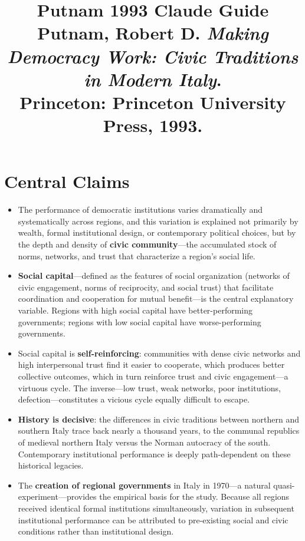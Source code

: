 \documentclass[12pt]{article}
\title{\textbf{Putnam 1993 Claude Guide}\\
\large Putnam, Robert D. \textit{Making Democracy Work: Civic Traditions in Modern Italy}.\\
Princeton: Princeton University Press, 1993.}
\author{}
\date{}
\begin{document}
\maketitle
\tableofcontents
\newpage

\section{Central Claims}

\begin{itemize}[leftmargin=*, itemsep=4pt]
    \item The performance of democratic institutions varies dramatically and systematically across regions, and this variation is explained not primarily by wealth, formal institutional design, or contemporary political choices, but by the depth and density of \textbf{civic community}---the accumulated stock of norms, networks, and trust that characterize a region's social life.
    \item \textbf{Social capital}---defined as the features of social organization (networks of civic engagement, norms of reciprocity, and social trust) that facilitate coordination and cooperation for mutual benefit---is the central explanatory variable. Regions with high social capital have better-performing governments; regions with low social capital have worse-performing governments.
    \item Social capital is \textbf{self-reinforcing}: communities with dense civic networks and high interpersonal trust find it easier to cooperate, which produces better collective outcomes, which in turn reinforce trust and civic engagement---a virtuous cycle. The inverse---low trust, weak networks, poor institutions, defection---constitutes a vicious cycle equally difficult to escape.
    \item \textbf{History is decisive}: the differences in civic traditions between northern and southern Italy trace back nearly a thousand years, to the communal republics of medieval northern Italy versus the Norman autocracy of the south. Contemporary institutional performance is deeply path-dependent on these historical legacies.
    \item The \textbf{creation of regional governments} in Italy in 1970---a natural quasi-experiment---provides the empirical basis for the study. Because all regions received identical formal institutions simultaneously, variation in subsequent institutional performance can be attributed to pre-existing social and civic conditions rather than institutional design.

\end{itemize}
\end{document}

